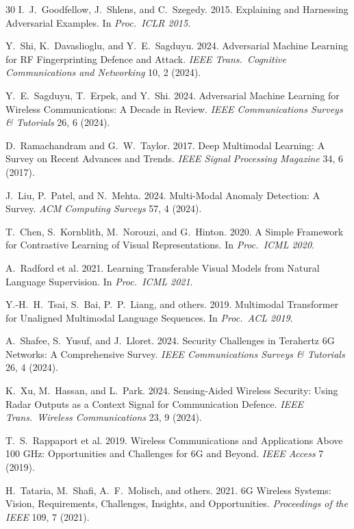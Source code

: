 \documentclass[sigconf,nonacm]{acmart}
\begin{document}
\begin{thebibliography}{30}
I.~J.~Goodfellow, J.~Shlens, and C.~Szegedy. 2015. Explaining
and Harnessing Adversarial Examples. In \textit{Proc.\ ICLR 2015}.

Y.~Shi, K.~Davaslioglu, and Y.~E.~Sagduyu. 2024. Adversarial
Machine Learning for RF Fingerprinting Defence and Attack.
\textit{IEEE Trans.\ Cognitive Communications and Networking}
10, 2 (2024).

Y.~E.~Sagduyu, T.~Erpek, and Y.~Shi. 2024. Adversarial Machine
Learning for Wireless Communications: A Decade in Review.
\textit{IEEE Communications Surveys \& Tutorials} 26, 6 (2024).

D.~Ramachandram and G.~W.~Taylor. 2017. Deep Multimodal
Learning: A Survey on Recent Advances and Trends.
\textit{IEEE Signal Processing Magazine} 34, 6 (2017).

J.~Liu, P.~Patel, and N.~Mehta. 2024. Multi-Modal Anomaly
Detection: A Survey. \textit{ACM Computing Surveys} 57, 4 (2024).

T.~Chen, S.~Kornblith, M.~Norouzi, and G.~Hinton. 2020. A
Simple Framework for Contrastive Learning of Visual
Representations. In \textit{Proc.\ ICML 2020}.

A.~Radford et al. 2021. Learning Transferable Visual Models
from Natural Language Supervision. In \textit{Proc.\ ICML 2021}.

Y.-H.~H.~Tsai, S.~Bai, P.~P.~Liang, and others. 2019. Multimodal
Transformer for Unaligned Multimodal Language Sequences.
In \textit{Proc.\ ACL 2019}.

A.~Shafee, S.~Yusuf, and J.~Lloret. 2024. Security Challenges
in Terahertz 6G Networks: A Comprehensive Survey.
\textit{IEEE Communications Surveys \& Tutorials} 26, 4 (2024).

K.~Xu, M.~Hassan, and L.~Park. 2024. Sensing-Aided Wireless
Security: Using Radar Outputs as a Context Signal for
Communication Defence. \textit{IEEE Trans.\ Wireless
Communications} 23, 9 (2024).

T.~S.~Rappaport et al. 2019. Wireless Communications and
Applications Above 100 GHz: Opportunities and Challenges for
6G and Beyond. \textit{IEEE Access} 7 (2019).

H.~Tataria, M.~Shafi, A.~F.~Molisch, and others. 2021. 6G
Wireless Systems: Vision, Requirements, Challenges, Insights,
and Opportunities. \textit{Proceedings of the IEEE} 109, 7 (2021).


\end{thebibliography}
\end{document}
